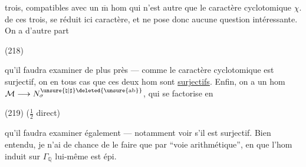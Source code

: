 
trois, compatibles avec un $\overline{\mathrm m}$ hom
qui n'est autre que le caractère cyclotomique $\chi$.
 de ces trois,
se réduit ici  caractère, et ne pose donc aucune question intéressante. On a d'autre part

\noindent (218)\quad
{}

qu'il faudra examiner de plus près --- comme le caractère cyclotomique est  surjectif, on  en tous cas que ces deux hom sont \uline{surjectifs}. Enfin, on a un hom
$\mathcal M\longrightarrow N_{\sigma}^{\unsure{\natural|\sharp}\deleted{\unsure{\mathrm{ab}}}}$, qui se factorise en

\noindent (219)\quad
{}
\hfill ($\frac12$ direct)

qu'il faudra examiner également --- notamment voir s'il est surjectif.
Bien entendu, je n'ai de chance de le faire que par ``voie arithmétique'', en  que l'hom induit sur $\Gamma_{\mathbb Q}$ lui-même est épi.

